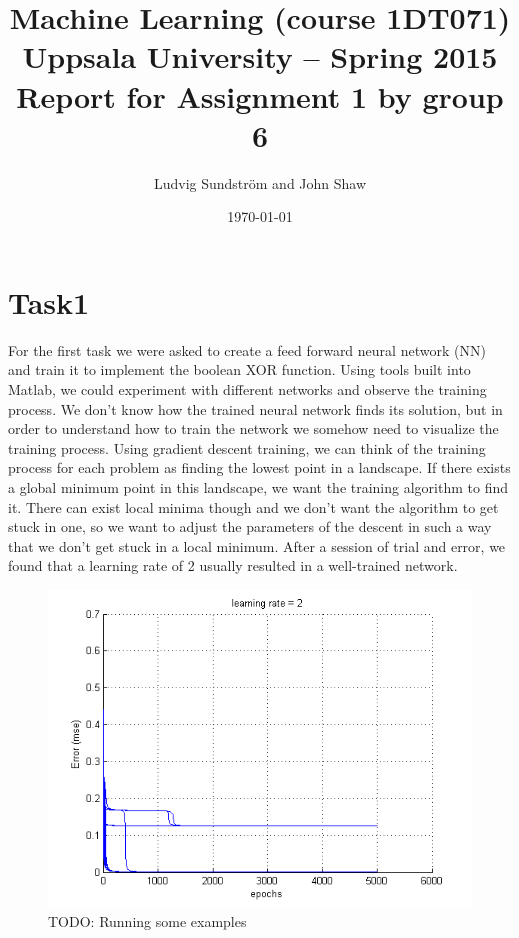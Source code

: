 \documentclass[a4paper]{article}
\title{Machine Learning (course 1DT071)
Uppsala University – Spring 2015
Report for Assignment 1 by group 6}
\author{Ludvig Sundstr\"{o}m and John Shaw}
\date{\today}
\begin{document}
\maketitle

\section{Task1}

For the first task we were asked to create a feed forward neural network (NN) and 
train it to implement the boolean XOR function. Using tools built into Matlab, we 
could experiment with different networks and observe the training process. 
We don't know how the trained neural network finds its solution, 
but in order to understand how to train the network we somehow need to 
visualize the training process. 
Using gradient descent training, we can think of the training process for each problem 
as finding the lowest point in a landscape. If there exists a global minimum point in 
this landscape, we want the training algorithm to find it. There can exist local minima 
though and we don't want the algorithm to get stuck in one, so we want to 
adjust the parameters of the descent in such a way that we don't get stuck in a local 
minimum. After a session of trial and error, we found that a learning rate of 2 
usually resulted in a well-trained network. 

\begin{figure}[h!] %
	\caption{\label{fig:plot2_LR2}TODO: Running some examples}
	\includegraphics[]{plot2_LR2.png}
\end{figure}
\end{document}
